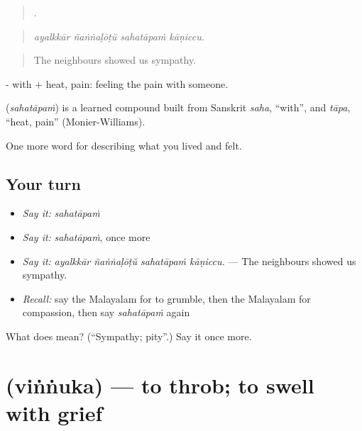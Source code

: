 \begin{quote}
   .
\end{quote}

\begin{quote}
\emph{ayalkkār ñaṅṅaḷōṭŭ sahatāpaṁ kāṇiccu.}
\end{quote}

\begin{quote}
The neighbours showed us sympathy.
\end{quote}

- with +  heat, pain: feeling the pain with someone.

\begin{cousinweb}
\textbf{} (\emph{sahatāpaṁ}) is a learned compound built from Sanskrit \emph{saha}, \textquotedblleft{}with\textquotedblright{}, and \emph{tāpa}, \textquotedblleft{}heat, pain\textquotedblright{} (Monier-Williams).
\end{cousinweb}

\begin{grammarlens}[title={What you've built}]
One more word for describing what you lived and felt.
\end{grammarlens}

\subsection*{Your turn}
\begin{itemize}
\raggedright
  \item \emph{Say it:} \emph{sahatāpaṁ}
  \item \emph{Say it:} \emph{sahatāpaṁ}, once more
  \item \emph{Say it:} \emph{ayalkkār ñaṅṅaḷōṭŭ sahatāpaṁ kāṇiccu.} — The neighbours showed us sympathy.
  \item \emph{Recall:} say the Malayalam for to grumble, then the Malayalam for compassion, then say \emph{sahatāpaṁ} again
\end{itemize}

\begin{tcolorbox}[breakable,colback=teal!4,colframe=teal!35!black,title={Before you move on}]
What does  mean? (\textquotedblleft{}Sympathy; pity\textquotedblright{}.) Say it once more.
\end{tcolorbox}
\section[\texorpdfstring{\ml{വിങ്ങുക} (viṅṅuka)}{വിങ്ങുക (viṅṅuka)}]{ (viṅṅuka) — to throb; to swell with grief}

